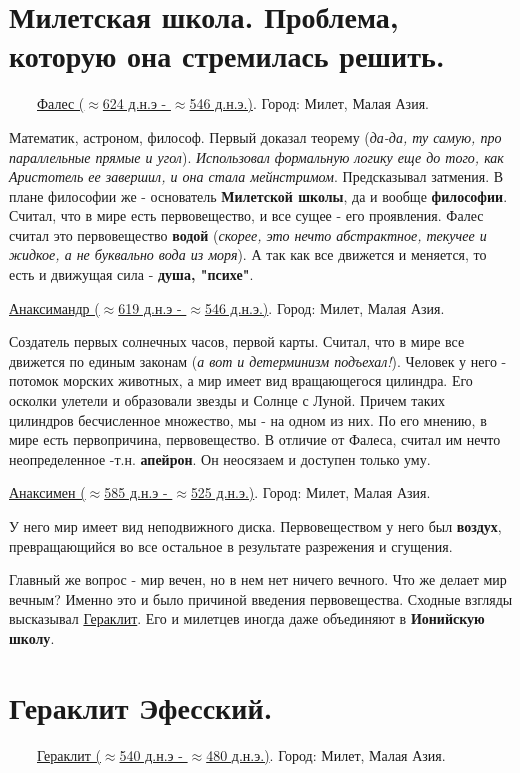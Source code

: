 \documentclass[12pt,a4paper]{article}
\begin{document}
\section{Милетская школа. Проблема, которую она стремилась решить.}
\ \ \ \
\underline{Фалес ($\approx$624 д.н.э - $\approx$546 д.н.э.)}. Город: Милет, Малая Азия.

Математик, астроном, философ. Первый доказал теорему (\textit{да-да, ту самую, про параллельные прямые и угол}). \textit{Использовал формальную логику еще до того, как Аристотель ее завершил, и она стала мейнстримом}. Предсказывал затмения. В плане философии же - основатель \textbf{Милетской школы}, да и вообще \textbf{философии}. Считал, что в мире есть первовещество, и все сущее - его проявления. Фалес считал это первовещество \textbf{водой} (\textit{скорее, это нечто абстрактное, текучее и жидкое, а не буквально вода из моря}). А так как все движется и меняется, то есть и движущая сила - \textbf{душа, "психе"}.

\underline{Анаксимандр ($\approx$619 д.н.э - $\approx$546 д.н.э.)}. Город: Милет, Малая Азия.

Создатель первых солнечных часов, первой карты.
Считал, что в мире все движется по единым законам (\textit{а вот и детерминизм подъехал!}). Человек у него - потомок морских животных, а мир имеет вид вращающегося цилиндра. Его осколки улетели и образовали звезды и Солнце с Луной. Причем таких цилиндров бесчисленное множество, мы - на одном из них.
По его мнению, в мире есть первопричина, первовещество. В отличие от Фалеса, считал им нечто неопределенное -т.н. \textbf{апейрон}. Он неосязаем и доступен только уму.

\underline{Анаксимен ($\approx$585 д.н.э - $\approx$525 д.н.э.)}. Город: Милет, Малая Азия.

У него мир имеет вид неподвижного диска. 
Первовеществом у него был \textbf{воздух}, превращающийся во все остальное в результате разрежения и сгущения.

Главный же вопрос - мир вечен, но в нем нет ничего вечного. Что же делает мир вечным? Именно это и было причиной введения первовещества. Сходные взгляды высказывал \underline{Гераклит}. Его и милетцев иногда даже объединяют в \textbf{Ионийскую школу}.

\section{Гераклит Эфесский.}
\ \ \ \
\underline{Гераклит ($\approx$540 д.н.э - $\approx$480 д.н.э.)}. Город: Милет, Малая Азия.
\end{document}
